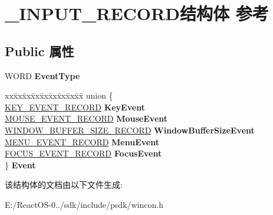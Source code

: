 \hypertarget{struct___i_n_p_u_t___r_e_c_o_r_d}{}\section{\+\_\+\+I\+N\+P\+U\+T\+\_\+\+R\+E\+C\+O\+R\+D结构体 参考}
\label{struct___i_n_p_u_t___r_e_c_o_r_d}
\subsection*{Public 属性}
\begin{DoxyCompactItemize}
\item 
\mbox{\label{struct___i_n_p_u_t___r_e_c_o_r_d_ad51c0bd2fcb07584c56eca4d90891dd4}} 
W\+O\+RD {\bfseries Event\+Type}
\item 
\mbox{\label{struct___i_n_p_u_t___r_e_c_o_r_d_a15f784c4b39c97cb8392bf22aa171b1d}} 
\begin{tabbing}
xx\=xx\=xx\=xx\=xx\=xx\=xx\=xx\=xx\=\kill
union \{\\
\>\hyperlink{struct___k_e_y___e_v_e_n_t___r_e_c_o_r_d}{KEY\_EVENT\_RECORD} {\bfseries KeyEvent}\\
\>\hyperlink{struct___m_o_u_s_e___e_v_e_n_t___r_e_c_o_r_d}{MOUSE\_EVENT\_RECORD} {\bfseries MouseEvent}\\
\>\hyperlink{struct___w_i_n_d_o_w___b_u_f_f_e_r___s_i_z_e___r_e_c_o_r_d}{WINDOW\_BUFFER\_SIZE\_RECORD} {\bfseries WindowBufferSizeEvent}\\
\>\hyperlink{struct___m_e_n_u___e_v_e_n_t___r_e_c_o_r_d}{MENU\_EVENT\_RECORD} {\bfseries MenuEvent}\\
\>\hyperlink{struct___f_o_c_u_s___e_v_e_n_t___r_e_c_o_r_d}{FOCUS\_EVENT\_RECORD} {\bfseries FocusEvent}\\
\} {\bfseries Event}\\

\end{tabbing}\end{DoxyCompactItemize}


该结构体的文档由以下文件生成\+:\begin{DoxyCompactItemize}
\item 
E\+:/\+React\+O\+S-\/0../sdk/include/psdk/wincon.\+h\end{DoxyCompactItemize}
